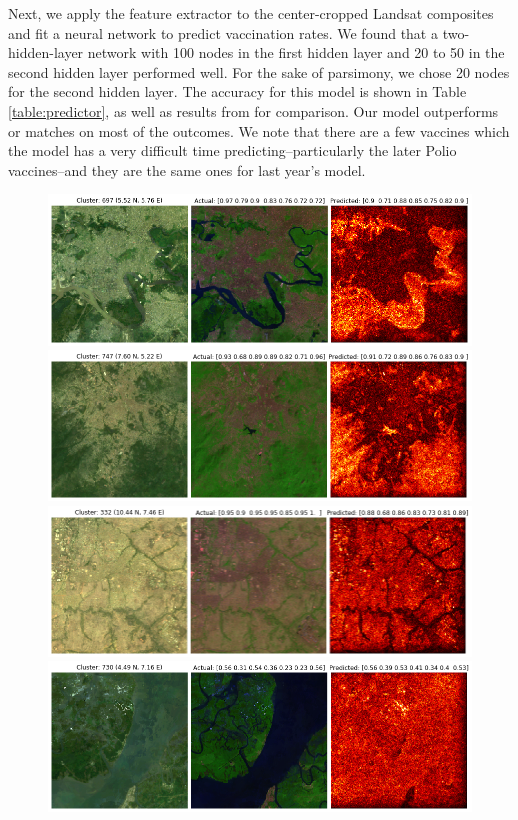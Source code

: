 \documentclass[]{article}
\begin{document}
Next, we apply the feature extractor to the center-cropped Landsat composites and fit a neural network to predict vaccination rates. We found that a two-hidden-layer network with 100 nodes in the first hidden layer and 20 to 50 in the second hidden layer performed well. For the sake of parsimony, we chose 20 nodes for the second hidden layer. The accuracy for this model is shown in Table \ref{table:predictor}, as well as results from \cite{zhan2019} for comparison. Our model outperforms or matches \cite{zhan2019} on most of the outcomes. We note that there are a few vaccines which the model has a very difficult time predicting--particularly the later Polio vaccines--and they are the same ones for last year's model.

\begin{figure}[p!]
\centering
\includegraphics[width=.9\linewidth]{ig1.png} \\
\includegraphics[width=.9\linewidth]{ig2.png} \\
\includegraphics[width=.9\linewidth]{ig4.png} \\
\includegraphics[width=.9\linewidth]{ig5.png} \\

\end{figure}
\end{document}
